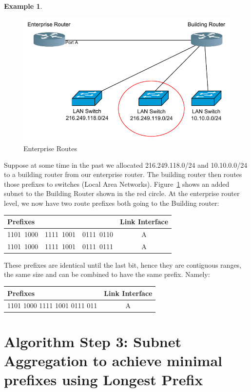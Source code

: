 \documentclass[pdf,bookmarks,colorlinks=true]{article}
\theoremstyle{definition}
\newtheorem{example}{Example}[section]
\begin{document}
\begin{example}\label{ex:2}
	\begin{figure}[hb]
		\centering
		\includegraphics[width=0.6\linewidth]{example2.pdf}
		\caption{Enterprise Routes}
		\label{fig:router_config}
	\end{figure}
	
	Suppose at some time in the past we allocated 216.249.118.0/24 and 10.10.0.0/24 to a building router from our enterprise router. The building router then routes those prefixes to switches (Local Area Networks). Figure~\ref{fig:router_config} shows an added subnet to the Building Router shown in the red circle. At the enterprise router level, we now have two route prefixes both going to the Building router: 
	\begin{center}
		\begin{tabular}{|l|c|}\hline
			Prefixes & Link Interface \\ \hline
			1101~1000~~1111~1001~~0111~0110 & A \\
			1101~1000~~1111~1001~~0111~0111 & A \\ \hline
		\end{tabular}
	\end{center}
	These prefixes are identical until the last bit, hence they are contiguous ranges, the same size and can be combined to have the same prefix. Namely:  
	\begin{center}
		\begin{tabular}{|l|c|}\hline
			Prefixes & Link Interface \\ \hline
			1101 1000  1111 1001  0111 011 & A \\ \hline
		\end{tabular}
	\end{center}
	
\end{example}

\section{Algorithm Step 3: Subnet Aggregation to achieve minimal prefixes using Longest Prefix}
\end{document}
